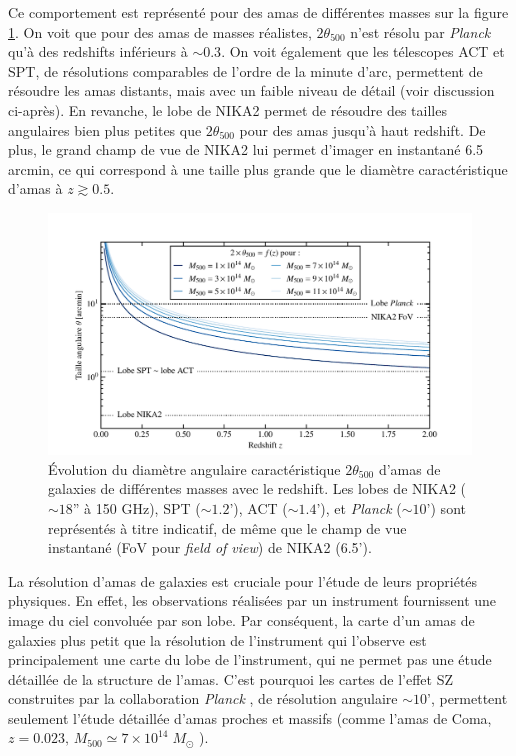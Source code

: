 Ce comportement est représenté pour des amas de différentes masses sur la figure \ref{fig:nk_angular_sizes}.
On voit que pour des amas de masses réalistes, $2\theta_{500}$ n'est résolu par \textit{Planck} qu'à des redshifts inférieurs à $\sim 0.3$.
On voit également que les télescopes ACT et SPT, de résolutions comparables de l'ordre de la minute d'arc, permettent de résoudre les amas distants, mais avec un faible niveau de détail (voir discussion ci-après).
En revanche, le lobe de NIKA2 permet de résoudre des tailles angulaires bien plus petites que $2\theta_{500}$ pour des amas jusqu'à haut redshift.
De plus, le grand champ de vue de NIKA2 lui permet d'imager en instantané 6.5 arcmin, ce qui correspond à une taille plus grande que le diamètre caractéristique d'amas à $z \gtrsim 0.5$.

\begin{figure}[t]
    \centering
    \includegraphics[width=.85\linewidth]{Figures/chap_nk/angular_sizes.pdf}
    \caption{
        Évolution du diamètre angulaire caractéristique $2\theta_{500}$ d'amas de galaxies de différentes masses avec le redshift.
        Les lobes de NIKA2 ($\sim 18$'' à 150 GHz), SPT ($\sim 1.2$'), ACT ($\sim 1.4$'), et \textit{Planck} ($\sim 10$') sont représentés à titre indicatif, de même que le champ de vue instantané (FoV pour \textit{field of view}) de NIKA2 (6.5').
    }
    \label{fig:nk_angular_sizes}
\end{figure}

La résolution d'amas de galaxies est cruciale pour l'étude de leurs propriétés physiques.
En effet, les observations réalisées par un instrument fournissent une image du ciel convoluée par son lobe.
Par conséquent, la carte d'un amas de galaxies plus petit que la résolution de l'instrument qui l'observe est principalement une carte du lobe de l'instrument, qui ne permet pas une étude détaillée de la structure de l'amas.
C'est pourquoi les cartes de l'effet SZ construites par la collaboration \textit{Planck} \cite{planck_collaboration_planck_2016-4}, de résolution angulaire $\sim 10$', permettent seulement l'étude détaillée d'amas proches et massifs (comme l'amas de Coma, $z = 0.023, \, M_{500} \simeq 7 \times 10^{14} \;M_\odot$ \cite{ade_planck_2013-1}).

